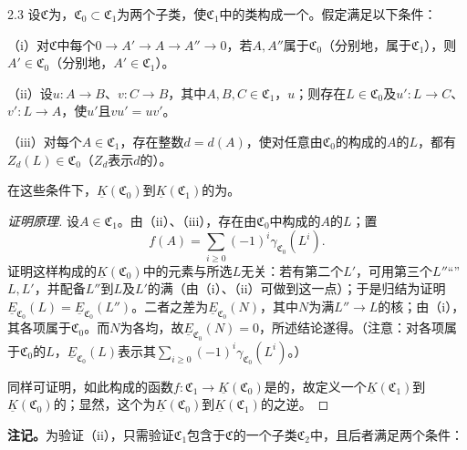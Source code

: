 \begin{SGAresult}{}{2.3}
设$\mathfrak C$为，$\mathfrak C_0\subset\mathfrak C_1$为两个子类，使$\mathfrak C_1$中的类构成一个。假定满足以下条件：

（i）对$\mathfrak C$中每个$0\to A'\to A\to A''\to0$，若$A,A''$属于$\mathfrak C_0$（分别地，属于$\mathfrak C_1$），则$A'\in\mathfrak C_0$（分别地，$A'\in\mathfrak C_1$）。

（ii）设$u:A\to B$、$v:C\to B$，其中$A,B,C\in\mathfrak C_1$，$u$；则存在$L\in\mathfrak C_0$及$u':L\to C$、$v':L\to A$，使$u'$且$vu'=uv'$。

（iii）对每个$A\in\mathfrak C_1$，存在整数$d=d(A)$，使对任意由$\mathfrak C_0$的构成的$A$的$L$，都有$Z_d(L)\in\mathfrak C_0$（$Z_d$表示$d$的）。

在这些条件下，$\underline K(\mathfrak C_0)$到$\underline K(\mathfrak C_1)$的为。
\end{SGAresult}
\begin{proof}[证明原理]
设$A\in\mathfrak C_1$。由（ii）、（iii），存在由$\mathfrak C_0$中构成的$A$的$L$；置
\[f(A)=\sum_{i\geq0}(-1)^i\gamma_{\mathfrak C_0}(L^i).\]
证明这样构成的$\underline K(\mathfrak C_0)$中的元素与所选$L$无关：若有第二个$L'$，可用第三个$L''$“”$L,L'$，并配备$L''$到$L$及$L'$的满（由（i）、（ii）可做到这一点）；于是归结为证明$\underline E_{\mathfrak C_0}(L)=\underline E_{\mathfrak C_0}(L'')$。二者之差为$\underline E_{\mathfrak C_0}(N)$，其中$N$为满$L''\to L$的核；由（i），其各项属于$\mathfrak C_0$。而$N$为各均，故$\underline E_{\mathfrak C_0}(N)=0$，所述结论遂得。（注意：对各项属于$\mathfrak C_0$的$L$，$\underline E_{\mathfrak C_0}(L)$表示其$\sum_{i\geq0}(-1)^i\gamma_{\mathfrak C_0}(L^i)$。）

同样可证明，如此构成的函数$f:\mathfrak C_1\to\underline K(\mathfrak C_0)$是的，故定义一个$\underline K(\mathfrak C_1)$到$\underline K(\mathfrak C_0)$的；显然，这个为$\underline K(\mathfrak C_0)$到$\underline K(\mathfrak C_1)$的之逆。
\end{proof}
\textbf{注记。}为验证（ii），只需验证$\mathfrak C_1$包含于$\mathfrak C$的一个子类$\mathfrak C_2$中，且后者满足两个条件：

